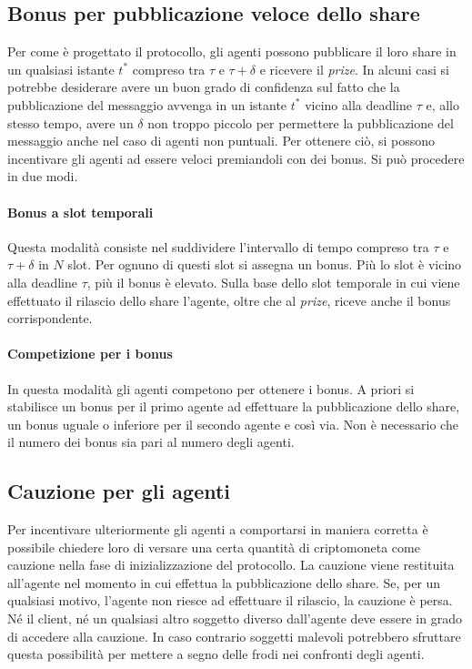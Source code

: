 \subsection{Bonus per pubblicazione veloce dello share}
Per come è progettato il protocollo, gli agenti possono pubblicare il loro share in un qualsiasi istante
$ t^* $ compreso tra 
$ \tau $ e $ \tau + \delta $ e ricevere il \textit{prize}. In alcuni casi si potrebbe desiderare avere un buon grado di confidenza sul fatto che la pubblicazione del messaggio avvenga in un istante $ t^* $ vicino alla deadline $ \tau $ e, allo stesso tempo, avere un $ \delta $ non troppo piccolo per permettere la pubblicazione del messaggio anche nel caso di agenti non puntuali. Per ottenere ciò, si possono incentivare gli agenti ad essere veloci premiandoli con dei bonus. Si può procedere in due modi.
\paragraph{Bonus a slot temporali} Questa modalità consiste nel suddividere l'intervallo di tempo compreso tra $ \tau $ e $ \tau + \delta $ in $ N $ slot. Per ognuno di questi slot si assegna un bonus. Più lo slot
è vicino alla deadline $ \tau $, più il bonus è elevato. Sulla base dello slot temporale in cui viene effettuato il rilascio dello share l'agente, oltre che al \textit{prize}, riceve anche il bonus corrispondente.
\paragraph{Competizione per i bonus} In questa modalità gli agenti competono per ottenere i bonus. A priori si stabilisce un bonus per il primo agente ad effettuare la pubblicazione dello share, un bonus uguale o inferiore per il secondo agente e così via.
Non è necessario che il numero dei bonus sia pari al numero degli agenti.

\subsection{Cauzione per gli agenti}
\label{subsec:cauzione-agenti}
Per incentivare ulteriormente gli agenti a comportarsi in maniera corretta è possibile chiedere loro di versare una certa quantità di criptomoneta come cauzione nella fase di inizializzazione del protocollo. La cauzione viene restituita all'agente nel momento in cui effettua la pubblicazione dello share. Se, per un qualsiasi motivo, l'agente non riesce ad effettuare il rilascio, la cauzione è persa. Né il client, né un qualsiasi altro soggetto diverso dall'agente deve essere in grado di accedere alla cauzione. In caso contrario soggetti malevoli potrebbero sfruttare questa possibilità per mettere a segno delle frodi nei confronti degli agenti. 